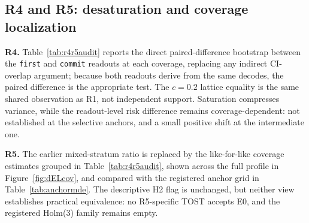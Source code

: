 \documentclass{article}
\begin{document}
\subsection{R4 and R5: desaturation and coverage localization}
\label{sec:r4r5}

\textbf{R4.} Table~\ref{tab:r4r5audit} reports the direct paired-difference bootstrap between
the \texttt{first} and \texttt{commit} readouts at each coverage, replacing any indirect
CI-overlap argument; because both readouts derive from the same decodes, the paired difference
is the appropriate test.  The $c=0.2$ lattice equality is the same shared observation as R1,
not independent support.  Saturation compresses variance, while the readout-level risk
difference remains coverage-dependent: not established at the selective anchors, and a small
positive shift at the intermediate one.

\textbf{R5.} The earlier mixed-stratum ratio is replaced by the like-for-like coverage estimates
grouped in Table~\ref{tab:r4r5audit}, shown across the full profile in
Figure~\ref{fig:dELcov}, and compared with the registered anchor grid in
Table~\ref{tab:anchormde}.  The descriptive H2 flag is unchanged, but neither view establishes
practical equivalence: no R5-specific TOST accepts E0, and the registered Holm(3) family remains
empty.
\end{document}
